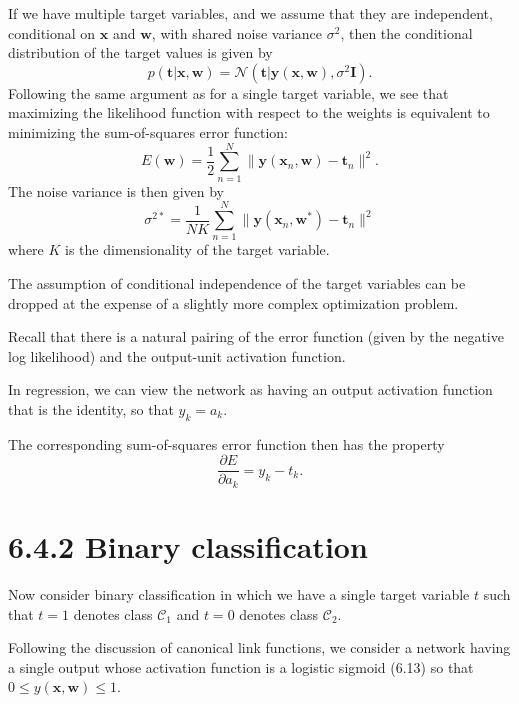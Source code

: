\documentclass{article}
\begin{document}
If we have multiple target variables, and we assume that they are independent, conditional on $\mathbf{x}$ and $\mathbf{w}$, with shared noise variance $\sigma^2$, then the conditional distribution of the target values is given by
\begin{equation}
p(\mathbf{t}|\mathbf{x}, \mathbf{w}) = \mathcal{N}\left(\mathbf{t}|\mathbf{y}(\mathbf{x}, \mathbf{w}), \sigma^2 \mathbf{I}\right).
\tag{6.28}
\end{equation}
Following the same argument as for a single target variable, we see that maximizing the likelihood function with respect to the weights is equivalent to minimizing the sum-of-squares error function:
\begin{equation}
E(\mathbf{w}) = \frac{1}{2} \sum_{n=1}^N \|\mathbf{y}(\mathbf{x}_n, \mathbf{w}) - \mathbf{t}_n\|^2.
\tag{6.29}
\end{equation}
The noise variance is then given by
\begin{equation}
\sigma^{2*} = \frac{1}{NK} \sum_{n=1}^N \|\mathbf{y}(\mathbf{x}_n, \mathbf{w}^*) - \mathbf{t}_n\|^2
\tag{6.30}
\end{equation}
where $K$ is the dimensionality of the target variable. 

The assumption of conditional independence of the target variables can be dropped at the expense of a slightly more complex optimization problem.

Recall that there is a natural pairing of the error function (given by the negative log likelihood) and the output-unit activation function. 

In regression, we can view the network as having an output activation function that is the identity, so that $y_k = a_k$. 

The corresponding sum-of-squares error function then has the property
\begin{equation}
\frac{\partial E}{\partial a_k} = y_k - t_k.
\tag{6.31}
\end{equation}

\section{6.4.2 Binary classification}

Now consider binary classification in which we have a single target variable $t$ such that $t = 1$ denotes class $\mathcal{C}_1$ and $t = 0$ denotes class $\mathcal{C}_2$. 

Following the discussion of canonical link functions, we consider a network having a single output whose activation function is a logistic sigmoid (6.13) so that $0 \leqslant y(\mathbf{x}, \mathbf{w}) \leqslant 1$. 
\end{document}
